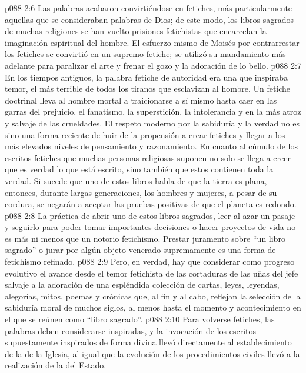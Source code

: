\vs p088 2:6 \pc Las palabras acabaron convirtiéndose en fetiches, más particularmente aquellas que se consideraban palabras de Dios; de este modo, los libros sagrados de muchas religiones se han vuelto prisiones fetichistas que encarcelan la imaginación espiritual del hombre. El esfuerzo mismo de Moisés por contrarrestar los fetiches se convirtió en un supremo fetiche; se utilizó su mandamiento más adelante para paralizar el arte y frenar el gozo y la adoración de lo bello.
\vs p088 2:7 En los tiempos antiguos, la palabra fetiche de autoridad era una  que inspiraba temor, el más terrible de todos los tiranos que esclavizan al hombre. Un fetiche doctrinal lleva al hombre mortal a traicionarse a sí mismo hasta caer en las garras del prejuicio, el fanatismo, la superstición, la intolerancia y en la más atroz y salvaje de las crueldades. El respeto moderno por la sabiduría y la verdad no es sino una forma reciente de huir de la propensión a crear fetiches y llegar a los más elevados niveles de pensamiento y razonamiento. En cuanto al cúmulo de los escritos fetiches que muchas personas religiosas suponen  no solo se llega a creer que es verdad lo que está escrito, sino también que estos contienen toda la verdad. Si sucede que uno de estos libros habla de que la tierra es plana, entonces, durante largas generaciones, los hombres y mujeres, a pesar de su cordura, se negarán a aceptar las pruebas positivas de que el planeta es redondo.
\vs p088 2:8 La práctica de abrir uno de estos libros sagrados, leer al azar un pasaje y seguirlo para poder tomar importantes decisiones o hacer proyectos de vida no es más ni menos que un notorio fetichismo. Prestar juramento sobre “un libro sagrado” o jurar por algún objeto venerado supremamente es una forma de fetichismo refinado.
\vs p088 2:9 Pero, en verdad, hay que considerar como progreso evolutivo el avance desde el temor fetichista de las cortaduras de las uñas del jefe salvaje a la adoración de una espléndida colección de cartas, leyes, leyendas, alegorías, mitos, poemas y crónicas que, al fin y al cabo, reflejan la selección de la sabiduría moral de muchos siglos, al menos hasta el momento y acontecimiento en el que se reúnen como “libro sagrado”.
\vs p088 2:10 Para volverse fetiches, las palabras deben considerarse inspiradas, y la invocación de los escritos supuestamente inspirados de forma divina llevó directamente al establecimiento de la  de la Iglesia, al igual que la evolución de los procedimientos civiles llevó a la realización de la  del Estado.
